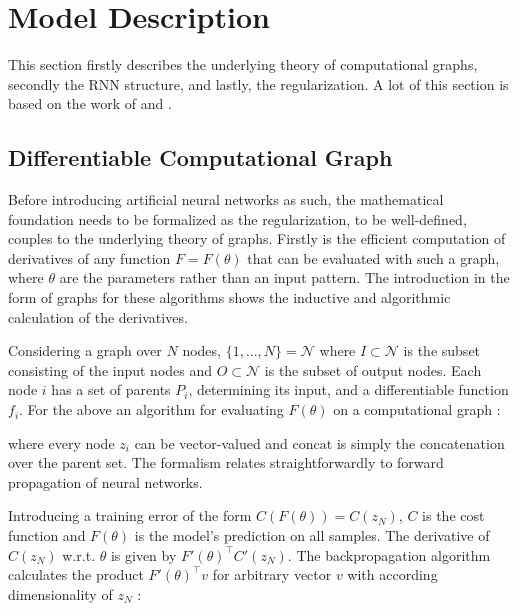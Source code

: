 \chapter{Model Description}

This section firstly describes the underlying theory of computational graphs, secondly the RNN structure, and lastly, the regularization. A lot of this section is based on the work of \textcite{suts} and \textcite{Martens2012}.

\section{Differentiable Computational Graph}

Before introducing artificial neural networks as such, the mathematical foundation needs to be formalized as the regularization, to be well-defined, couples to the underlying theory of graphs. Firstly is the efficient computation of derivatives of any function $F = F(\theta)$ that can be evaluated with such a graph, where $\theta$ are the parameters rather than an input pattern. The introduction in the form of graphs for these algorithms shows the inductive and algorithmic calculation of the derivatives.

Considering a graph over $N$ nodes, $\{1, ..., N\} = \mathcal{N}$ where $I \subset \mathcal{N}$ is the subset consisting of the input nodes and $O \subset \mathcal{N}$ is the subset of output nodes. Each node $i$ has a set of parents $P_i$, determining its input, and a differentiable function $f_i$. For the above an algorithm for evaluating $F(\theta)$ on a computational graph \cite{suts}:

\begin{algorithmic}[1]
    \EndFor
\end{algorithmic}

\noindent
where every node $z_i$ can be vector-valued and $\text{concat}$ is simply the concatenation over the parent set. The formalism relates straightforwardly to forward propagation of neural networks.

Introducing a training error of the form $C(F(\theta)) = C(z_N)$, $C$ is the cost function and $F(\theta)$ is the model's prediction on all samples. The derivative of $C(z_N)$ w.r.t. $\theta$ is given by $F'(\theta)^\intercal C'(z_N)$. The backpropagation algorithm calculates the product $F'(\theta)^\intercal v$ for arbitrary vector $v$ with according dimensionality of $z_N$ \cite{suts}:

